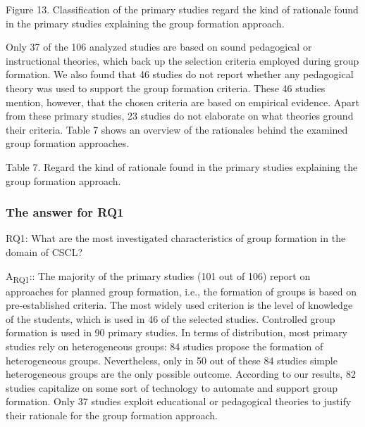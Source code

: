 Figure 13. Classification of the primary studies regard the kind of rationale found in the primary studies explaining the group formation approach.

Only 37 of the 106 analyzed studies are based on sound pedagogical or instructional theories, which back up the selection criteria employed during group formation. We also found that 46 studies do not report whether any pedagogical theory was used to support the group formation criteria. These 46 studies mention, however, that the chosen criteria are based on empirical evidence. Apart from these primary studies, 23 studies do not elaborate on what theories ground their criteria. Table 7 shows an overview of the rationales behind the examined group formation approaches.

Table 7. Regard the kind of rationale found in the primary studies explaining the group formation approach.


\subsubsection{The answer for RQ1}

RQ1: What are the most investigated characteristics of group formation in the domain of CSCL?

A\textsubscript{RQ1}:: The majority of the primary studies (101 out of 106) report on approaches for planned group formation, i.e., the formation of groups is based on pre-established criteria. The most widely used criterion is the level of knowledge of the students, which is used in 46 of the selected studies. Controlled group formation is used in 90 primary studies. In terms of distribution, most primary studies rely on heterogeneous groups: 84 studies propose the formation of heterogeneous groups. Nevertheless, only in 50 out of these 84 studies simple heterogeneous groups are the only possible outcome. According to our results, 82 studies capitalize on some sort of technology to automate and support group formation. Only 37 studies exploit educational or pedagogical theories to justify their rationale for the group formation approach. 

